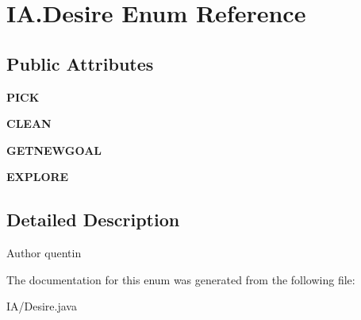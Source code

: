 \hypertarget{enum_i_a_1_1_desire}{}\section{I\+A.\+Desire Enum Reference}
\label{enum_i_a_1_1_desire}
\subsection*{Public Attributes}
\begin{DoxyCompactItemize}
\item 
\hypertarget{enum_i_a_1_1_desire_a76a68fbecf4b23f292c4beed7758373d}{}\label{enum_i_a_1_1_desire_a76a68fbecf4b23f292c4beed7758373d} 
{\bfseries P\+I\+CK}
\item 
\hypertarget{enum_i_a_1_1_desire_ae441608f9f2d8d07b1dfc452d1202c97}{}\label{enum_i_a_1_1_desire_ae441608f9f2d8d07b1dfc452d1202c97} 
{\bfseries C\+L\+E\+AN}
\item 
\hypertarget{enum_i_a_1_1_desire_a37a88a72c533c4e88cbbabd81105e335}{}\label{enum_i_a_1_1_desire_a37a88a72c533c4e88cbbabd81105e335} 
{\bfseries G\+E\+T\+N\+E\+W\+G\+O\+AL}
\item 
\hypertarget{enum_i_a_1_1_desire_a07c89126c6039806c8d192136733d7e9}{}\label{enum_i_a_1_1_desire_a07c89126c6039806c8d192136733d7e9} 
{\bfseries E\+X\+P\+L\+O\+RE}
\end{DoxyCompactItemize}


\subsection{Detailed Description}
\begin{DoxyAuthor}{Author}
quentin 
\end{DoxyAuthor}


The documentation for this enum was generated from the following file\+:\begin{DoxyCompactItemize}
\item 
I\+A/Desire.\+java\end{DoxyCompactItemize}
